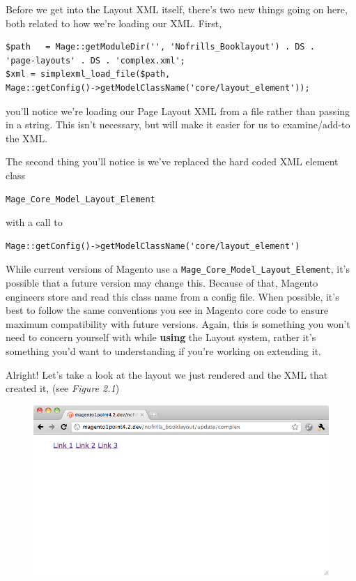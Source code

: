 \documentclass[oneside]{book}
\begin{document}
Before we get into the Layout XML itself, there's two new things going on here, both related to how we're loading our XML. First,

\begin{lstlisting}
$path   = Mage::getModuleDir('', 'Nofrills_Booklayout') . DS . 
'page-layouts' . DS . 'complex.xml';
$xml = simplexml_load_file($path,
Mage::getConfig()->getModelClassName('core/layout_element'));

\end{lstlisting}


you'll notice we're loading our Page Layout XML from a file rather than passing in a string.  This isn't necessary, but will make it easier for us to examine/add-to the XML.  

The second thing you'll notice is we've replaced the hard coded XML element class

\begin{lstlisting}
Mage_Core_Model_Layout_Element

\end{lstlisting}


with a call to

\begin{lstlisting}
Mage::getConfig()->getModelClassName('core/layout_element')

\end{lstlisting}


While current versions of Magento use a \footnotesize\texttt{Mage\_Core\_Model\_Layout\_Element}\normalsize, it's possible that a future version may change this.  Because of that, Magento engineers store and read this class name from a config file.  When possible, it's best to follow the same conventions you see in Magento core code to ensure maximum compatibility with future versions.  Again, this is something you won't need to concern yourself with while \textbf{using} the Layout system, rather it's something you'd want to understanding if you're working on extending it. 

Alright!  Let's take a look at the layout we just rendered and the XML that created it, (see \emph{Figure 2.1})

\begin{figure}[htb]
\begin{center}
\leavevmode
\includegraphics[width=1\textwidth]{images/chapter2/complex.png}
\end{center}
\caption{}
\end{figure}
\end{document}

